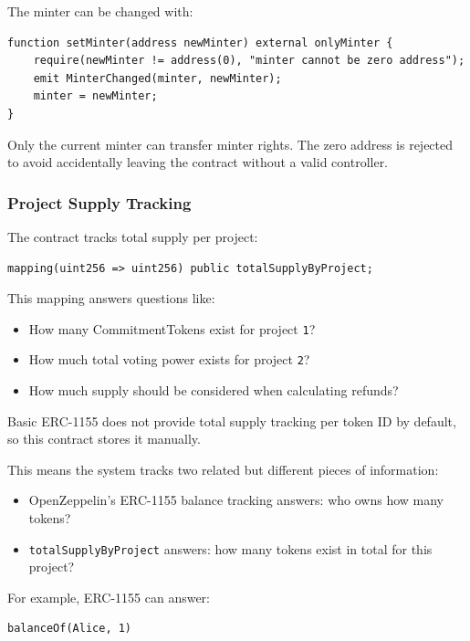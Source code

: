 \documentclass[11pt,a4paper]{article}
\begin{document}
The minter can be changed with:

\begin{lstlisting}
function setMinter(address newMinter) external onlyMinter {
    require(newMinter != address(0), "minter cannot be zero address");
    emit MinterChanged(minter, newMinter);
    minter = newMinter;
}
\end{lstlisting}

Only the current minter can transfer minter rights. The zero address is rejected to avoid accidentally leaving the contract without a valid controller.

\subsubsection{Project Supply Tracking}

The contract tracks total supply per project:

\begin{lstlisting}
mapping(uint256 => uint256) public totalSupplyByProject;
\end{lstlisting}

This mapping answers questions like:

\begin{itemize}
  \item How many CommitmentTokens exist for project \texttt{1}?
  \item How much total voting power exists for project \texttt{2}?
  \item How much supply should be considered when calculating refunds?
\end{itemize}

Basic ERC-1155 does not provide total supply tracking per token ID by default, so this contract stores it manually.

This means the system tracks two related but different pieces of information:

\begin{itemize}
  \item OpenZeppelin's ERC-1155 balance tracking answers: who owns how many tokens?
  \item \texttt{totalSupplyByProject} answers: how many tokens exist in total for this project?
\end{itemize}

For example, ERC-1155 can answer:

\begin{lstlisting}
balanceOf(Alice, 1)
\end{lstlisting}
\end{document}
